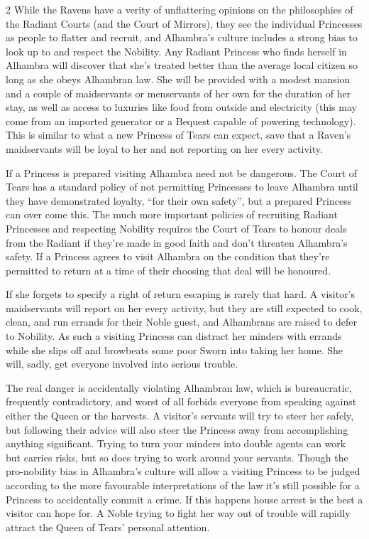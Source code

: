 \begin{multicols}{2}
While the Ravens have a verity of unflattering opinions on the philosophies of the Radiant Courts (and the Court of Mirrors), they see the individual Princesses as people to flatter and recruit, and Alhambra's culture includes a strong bias to look up to and respect the Nobility. Any Radiant Princess who finds herself in Alhambra will discover that she's treated better than the average local citizen so long as she obeys Alhambran law. She will be provided with a modest mansion and a couple of maidservants or menservants of her own for the duration of her stay, as well as access to luxuries like food from outside and electricity (this may come from an imported generator or a Bequest capable of powering technology). This is similar to what a new Princess of Tears can expect, save that a Raven's maidservants will be loyal to her and not reporting on her every activity. 

If a Princess is prepared visiting Alhambra need not be dangerous. The Court of Tears has a standard policy of not permitting Princesses to leave Alhambra until they have demonstrated loyalty, “for their own safety”, but a prepared Princess can over come this. The much more important policies of recruiting Radiant Princesses and respecting Nobility requires the Court of Tears to honour deals from the Radiant if they're made in good faith and don't threaten Alhambra's safety. If a Princess agrees to visit Alhambra on the condition that they're permitted to return at a time of their choosing that deal will be honoured.

If she forgets to specify a right of return escaping is rarely that hard. A visitor's maidservants will report on her every activity, but they are still expected to cook, clean, and run errands for their Noble guest, and Alhambrans are raised to defer to Nobility. As such a visiting Princess can distract her minders with errands while she slips off and browbeats some poor Sworn into taking her home. She will, sadly, get everyone involved into serious trouble.

The real danger is accidentally violating Alhambran law, which is bureaucratic, frequently contradictory, and worst of all forbids everyone from speaking against either the Queen or the harvests. A visitor's servants will try to steer her safely, but following their advice will also steer the Princess away from accomplishing anything significant. Trying to turn your minders into double agents can work but carries risks, but so does trying to work around your servants. Though the pro-nobility bias in Alhambra's culture will allow a visiting Princess to be judged according to the more favourable interpretations of the law it's still possible for a Princess to accidentally commit a crime. If this happens house arrest is the best a visitor can hope for. A Noble trying to fight her way out of trouble will rapidly attract the Queen of Tears' personal attention. 


\end{multicols}
